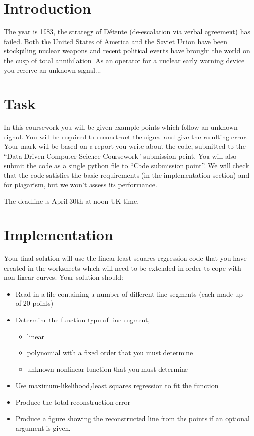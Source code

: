 \documentclass[12pt]{article}
\date{}
\author{Originally by: Michael Wray \& Davide Moltisanti}
\begin{document}
\maketitle

\section{Introduction}
\label{sec:intro}
The year is 1983, the strategy of D\'etente (de-escalation via verbal agreement) has failed.
Both the United States of America and the Soviet Union have been stockpiling nuclear weapons and recent political events have brought the world on the cusp of total annihilation.
As an operator for a nuclear early warning device you receive an unknown signal... 

\section{Task}
\label{sec:task}
In this coursework you will be given example points which follow an unknown signal.
You will be required to reconstruct the signal and give the resulting error.
Your mark will be based on a report you write about the code, submitted to the ``Data-Driven Computer Science Coursework'' submission point.
You will also submit the code as a single python file to ``Code submission point''.  
We will check that the code satisfies the basic requirements (in the implementation section) and for plagarism, but we won't assess its performance.

The deadline is April 30th at noon UK time.

\section{Implementation}
\label{sec:implementation}
Your final solution will use the linear least squares regression code that you have created in the worksheets which will need to be extended in order to cope with non-linear curves.
Your solution should:
\begin{itemize}
  \item Read in a file containing a number of different line segments (each made up of 20 points)
  \item Determine the function type of line segment, 
  \begin{itemize}
    \item linear
    \item polynomial with a fixed order that you must determine
    \item unknown nonlinear function that you must determine
  \end{itemize}
  \item Use maximum-likelihood/least squares regression to fit the function
  \item Produce the total reconstruction error 
  \item Produce a figure showing the reconstructed line from the points if an optional argument is given. 
\end{itemize}
\end{document}
